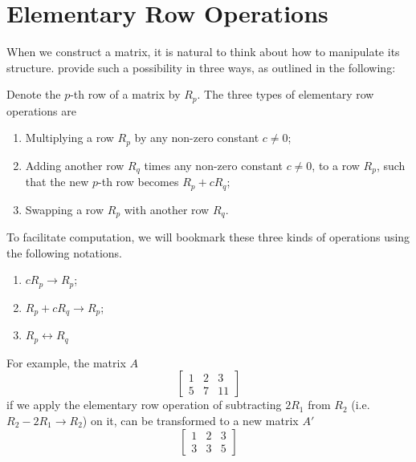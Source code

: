\section{Elementary Row Operations}
When we construct a matrix, it is natural to think about how to manipulate its structure.  provide such a possibility in three ways, as outlined in the following:
\begin{defn}
\label{defn:elerowop}
Denote the $p$-th row of a matrix by $R_{p}$. The three types of elementary row operations are
\begin{enumerate}
\item Multiplying a row $R_{p}$ by any non-zero constant $c \neq 0$;
\item Adding another row $R_{q}$ times any non-zero constant $c \neq 0$, to a row $R_{p}$, such that the new $p$-th row becomes $R_{p} + cR_{q}$;
\item Swapping a row $R_{p}$ with another row $R_{q}$.
\end{enumerate}
To facilitate computation, we will bookmark these three kinds of operations using the following notations.
\begin{enumerate}
\item $cR_{p} \rightarrow R_{p}$;
\item $R_{p} + cR_{q} \rightarrow R_{p}$;
\item $R_{p} \leftrightarrow R_{q}$
\end{enumerate}
\end{defn}
For example, the matrix $A$
\begin{equation*}
\begin{bmatrix}
1 & 2 & 3 \\
5 & 7 & 11
\end{bmatrix}
\end{equation*}
if we apply the elementary row operation of subtracting $2R_1$ from $R_2$ (i.e.\ $R_2 - 2R_1 \to R_2$) on it, can be transformed to a new matrix $A'$
\begin{equation*}
\begin{bmatrix}
1 & 2 & 3 \\
3 & 3 & 5
\end{bmatrix}
\end{equation*}
